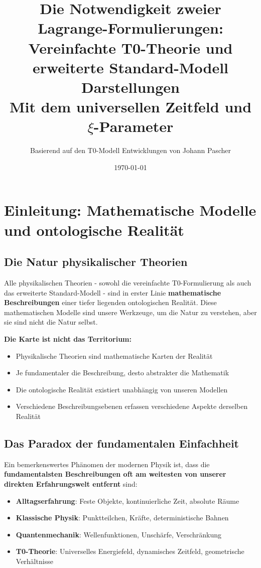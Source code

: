 \documentclass[12pt,a4paper]{article}
\title{Die Notwendigkeit zweier Lagrange-Formulierungen:\\
	Vereinfachte T0-Theorie und erweiterte Standard-Modell Darstellungen\\
	\large Mit dem universellen Zeitfeld und $\xi$-Parameter}
\author{Basierend auf den T0-Modell Entwicklungen von Johann Pascher}
\date{\today}
\begin{document}
	
	\maketitle
	
	\section{Einleitung: Mathematische Modelle und ontologische Realität}
	
	\subsection{Die Natur physikalischer Theorien}
	
	Alle physikalischen Theorien - sowohl die vereinfachte T0-Formulierung als auch das erweiterte Standard-Modell - sind in erster Linie \textbf{mathematische Beschreibungen} einer tiefer liegenden ontologischen Realität. Diese mathematischen Modelle sind unsere Werkzeuge, um die Natur zu verstehen, aber sie sind nicht die Natur selbst.
	
	\begin{tcolorbox}[colback=gray!5!white,colframe=gray!75!black,title=Fundamentale Erkenntnistheoretische Einsicht]
		\textbf{Die Karte ist nicht das Territorium:}
		\begin{itemize}
			\item Physikalische Theorien sind mathematische Karten der Realität
			\item Je fundamentaler die Beschreibung, desto abstrakter die Mathematik
			\item Die ontologische Realität existiert unabhängig von unseren Modellen
			\item Verschiedene Beschreibungsebenen erfassen verschiedene Aspekte derselben Realität
		\end{itemize}
	\end{tcolorbox}
	
	\subsection{Das Paradox der fundamentalen Einfachheit}
	
	Ein bemerkenswertes Phänomen der modernen Physik ist, dass die \textbf{fundamentalsten Beschreibungen oft am weitesten von unserer direkten Erfahrungswelt entfernt} sind:
	
	\begin{itemize}
		\item \textbf{Alltagserfahrung}: Feste Objekte, kontinuierliche Zeit, absolute Räume
		\item \textbf{Klassische Physik}: Punktteilchen, Kräfte, deterministische Bahnen
		\item \textbf{Quantenmechanik}: Wellenfunktionen, Unschärfe, Verschränkung
		\item \textbf{T0-Theorie}: Universelles Energiefeld, dynamisches Zeitfeld, geometrische Verhältnisse
	\end{itemize}
	
\end{document}
